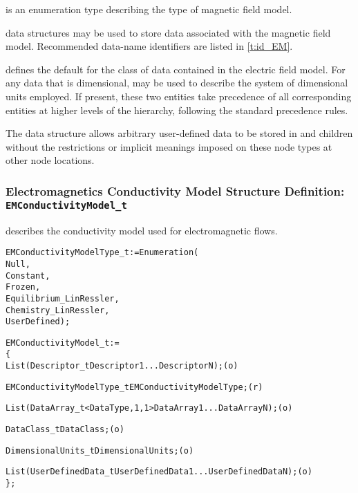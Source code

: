  is an enumeration type describing
the type of magnetic field model.

 data structures may be used to store data associated
with the magnetic field model.
Recommended data-name identifiers are listed in \autoref{t:id_EM}.

 defines the default for the class of data contained in
the electric field model.
For any data that is dimensional,  may be used to
describe the system of dimensional units employed.
If present, these two entities take precedence of all corresponding
entities at higher levels of the hierarchy, following the standard
precedence rules.

The  data structure allows arbitrary
user-defined data to be stored in  and
 children without the restrictions or implicit
meanings imposed on these node types at other node locations.

\subsubsection{Electromagnetics Conductivity Model Structure Definition: \texttt{EMConductivityModel\_t}}

 describes the conductivity model used
for electromagnetic flows.
\begin{alltt}
  EMConductivityModelType\_t := Enumeration(
    Null,
    Constant,
    Frozen,
    Equilibrium\_LinRessler,
    Chemistry\_LinRessler,
    UserDefined ) ;
\end{alltt}

\begin{alltt}
  EMConductivityModel\_t :=
    \{
    List( Descriptor\_t Descriptor1 ... DescriptorN ) ;                      (o)

    EMConductivityModelType\_t EMConductivityModelType ;                     (r)
    
    List( DataArray\_t<DataType, 1, 1> DataArray1 ... DataArrayN ) ;         (o)

    DataClass\_t DataClass ;                                                 (o)
                
    DimensionalUnits\_t DimensionalUnits ;                                   (o)

    List( UserDefinedData\_t UserDefinedData1 ... UserDefinedDataN ) ;       (o)
    \} ;
\end{alltt}

